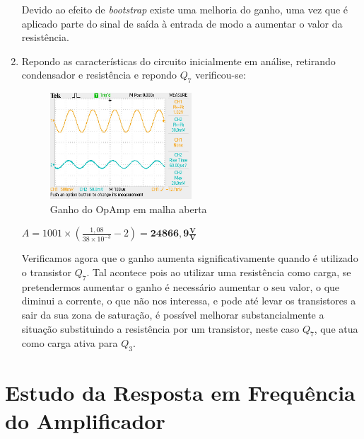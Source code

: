 \documentclass[a4paper]{article}
\begin{document}
\begin{enumerate}
                Devido ao efeito de \emph{bootstrap} existe uma melhoria do ganho, uma vez que é aplicado parte do sinal de saída à entrada de modo a aumentar o valor da resistência.
                \bigskip
                            
                \item Repondo as características do circuito inicialmente em análise, retirando condensador e resistência e repondo $Q_7$ verificou-se:
                \begin{figure}[H]
                    \centering
                    \includegraphics[width=0.5\textwidth]{figura7_ganhoMalhaAberta.JPG}
                    \caption{\label{fig:ganhoMalhaAberta}Ganho do OpAmp em malha aberta}
                \end{figure}
                \centerline{$A = 1001\times(\frac{1,08}{38\times10^{-3}} - 2) = \bm{24866,9\frac{V}{V}}$}
                \bigskip
                
	            Verificamos agora que o ganho aumenta significativamente quando é utilizado o transistor $Q_7$. Tal acontece pois ao utilizar uma resistência como carga, se pretendermos aumentar o ganho é necessário aumentar o seu valor, o que diminui a corrente, o que não nos interessa, e pode até levar os transistores a sair da sua zona de saturação, é possível melhorar substancialmente a situação substituindo a resistência por um transistor, neste caso $Q_7$, que atua como carga ativa para $Q_3$.
                \bigskip
            \end{enumerate}
        
\clearpage

\section{Estudo da Resposta em Frequência do Amplificador}
    \medskip
\end{document}
